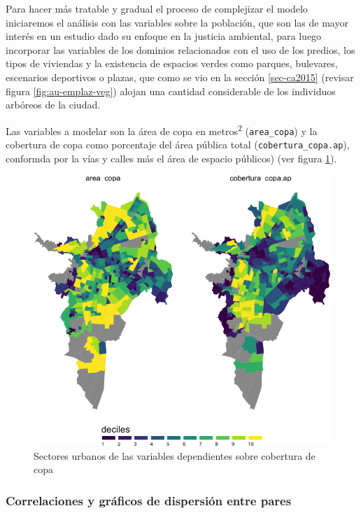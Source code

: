 \documentclass[12pt,]{book}
\begin{document}
Para hacer más tratable y gradual el proceso de complejizar el modelo
iniciaremos el análisis con las variables sobre la población, que son
las de mayor interés en un estudio dado su enfoque en la justicia
ambiental, para luego incorporar las variables de los dominios
relacionados con el uso de los predios, los tipos de viviendas y la
existencia de espacios verdes como parques, bulevares, escenarios
deportivos o plazas, que como se vio en la sección \ref{sec-ca2015}
(revisar figura \ref{fig:au-emplaz-veg}) alojan una cantidad
considerable de los individuos arbóreos de la ciudad.

Las variables a modelar son la área de copa en metros\textsuperscript{2}
(\texttt{area\_copa}) y la cobertura de copa como porcentaje del área
pública total (\texttt{cobertura\_copa.ap}), conformda por la vías y
calles más el área de espacio públicos) (ver figura
\ref{fig:mapa-copa-dep}).

\begin{figure}
\includegraphics[width=1\linewidth]{tesis-unigis_files/figure-latex/mapa-copa-dep-1} \caption{Sectores urbanos de las variables dependientes sobre cobertura de copa}\label{fig:mapa-copa-dep}
\end{figure}

\subsubsection{Correlaciones y gráficos de dispersión entre
pares}\label{correlaciones-y-graficos-de-dispersion-entre-pares}
\end{document}
